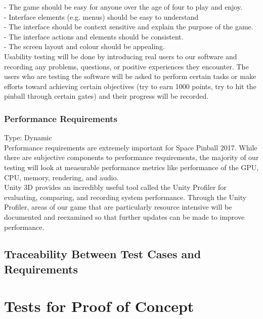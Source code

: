 \documentclass[12pt, titlepage]{article}
\begin{document}
- The game should be easy for anyone over the age of four to play and enjoy.\\
- Interface elements (e.g. menus) should be easy to understand\\
- The interface should be context sensitive and explain the purpose of the game.\\
- The interface actions and elements should be consistent.\\
- The screen layout and colour should be appealing.\\

Usability testing will be done by introducing real users to our software and recording any problems, questions, or positive experiences they encounter. The users who are testing the software will be asked to perform certain tasks or make efforts toward achieving certain objectives (try to earn 1000 points, try to hit the pinball through certain gates) and their progress will be recorded.\\


\subsubsection{Performance Requirements}

Type: Dynamic\\

Performance requirements are extremely important for Space Pinball 2017. While there are subjective components to performance requirements, the majority of our testing will look at measurable performance metrics like performance of the GPU, CPU, memory, rendering, and audio.\\

Unity 3D provides an incredibly useful tool called the Unity Profiler for evaluating, comparing, and recording system performance. Through the Unity Profiler, areas of our game that are particularly resource intensive will be documented and reexamined so that further updates can be made to improve performance. \\


\subsection{Traceability Between Test Cases and Requirements}

\section{Tests for Proof of Concept}
\end{document}
